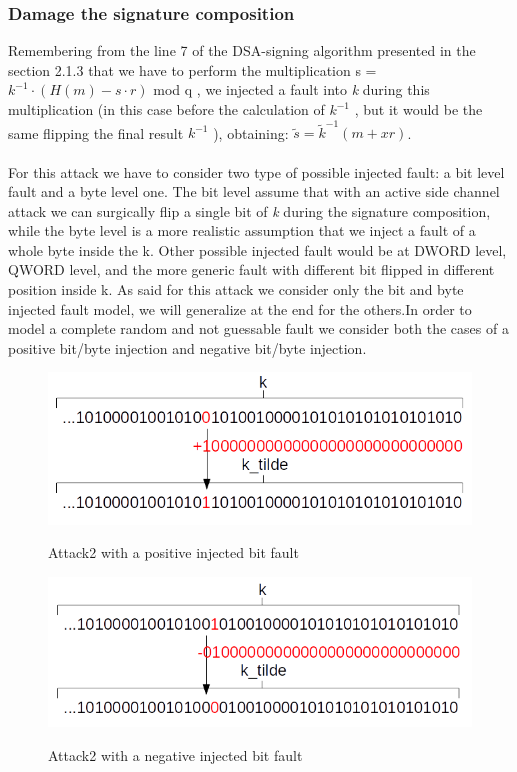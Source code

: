 \documentclass[11pt,english]{article}
\begin{document}
\subsubsection{Damage the signature composition}

Remembering from the line 7 of the DSA-signing algorithm presented in the section 2.1.3 that we have to perform the multiplication s  = $k^{-1} \cdot (H(m) - s \cdot r)$ mod q , we injected a fault into \textit{k} during this multiplication (in this case before the calculation of $k^{-1}$ , but it would be the same flipping the final result $k^{-1}$ ), obtaining: $\tilde{s} = \tilde{k}^{-1}(m + xr)$.
\\\\
For this attack we have to consider two type of possible injected fault: a bit level fault and a byte level one. The bit level assume that with an active side channel attack we can surgically flip a single bit of \textit{k} during the signature composition, while the byte level is a more realistic assumption that we inject a fault of a whole byte inside the k. Other possible injected fault would be at DWORD level, QWORD level, and the more generic fault with different bit flipped in different position inside k. As said for this attack we consider only the bit and byte injected fault model, we will generalize at the end for the others.In order to model a complete random and not guessable fault we consider both the cases of a positive bit/byte injection and negative bit/byte injection.

\begin{figure}[H]
\includegraphics[width=1.0\textwidth]{img/attack2bit.png} \\
\caption{\label{f_etichetta}Attack2 with a positive injected bit fault }
\end{figure}

\begin{figure}[H]
\includegraphics[width=1.0\textwidth]{img/attack2bitneg.png} \\
\caption{\label{f_etichetta}Attack2 with a negative injected bit fault }
\end{figure}
\end{document}
